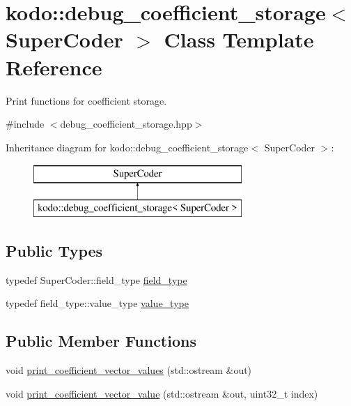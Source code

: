 \hypertarget{classkodo_1_1debug__coefficient__storage}{\section{kodo\-:\-:debug\-\_\-coefficient\-\_\-storage$<$ Super\-Coder $>$ Class Template Reference}
\label{classkodo_1_1debug__coefficient__storage}
}


Print functions for coefficient storage.  




{\ttfamily \#include $<$debug\-\_\-coefficient\-\_\-storage.\-hpp$>$}

Inheritance diagram for kodo\-:\-:debug\-\_\-coefficient\-\_\-storage$<$ Super\-Coder $>$\-:\begin{figure}[H]
\begin{center}
\leavevmode
\includegraphics[height=2.000000cm]{classkodo_1_1debug__coefficient__storage}
\end{center}
\end{figure}
\subsection*{Public Types}
\begin{DoxyCompactItemize}
\item 
typedef Super\-Coder\-::field\-\_\-type \hyperlink{classkodo_1_1debug__coefficient__storage_a84bcc1645af839927355175c06c9ab6a}{field\-\_\-type}
\begin{DoxyCompactList}\small\item\em \end{DoxyCompactList}\item 
typedef field\-\_\-type\-::value\-\_\-type \hyperlink{classkodo_1_1debug__coefficient__storage_a11acae745ea1f84a2e73816e4dfe64ec}{value\-\_\-type}
\begin{DoxyCompactList}\small\item\em \end{DoxyCompactList}\end{DoxyCompactItemize}
\subsection*{Public Member Functions}
\begin{DoxyCompactItemize}
\item 
void \hyperlink{classkodo_1_1debug__coefficient__storage_ab32d8d72fba9711e21f354dec49eac70}{print\-\_\-coefficient\-\_\-vector\-\_\-values} (std\-::ostream \&out)
\item 
void \hyperlink{classkodo_1_1debug__coefficient__storage_add771319983c0e4a2d57fd8753b5f6c9}{print\-\_\-coefficient\-\_\-vector\-\_\-value} (std\-::ostream \&out, uint32\-\_\-t index)
\end{DoxyCompactItemize}


